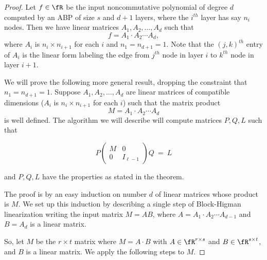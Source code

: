 \begin{proof}
  Let $f\in \fR$ be the input noncommutative polynomial of degree $d$
  computed by an ABP of size $s$ and $d+1$ layers, where the $i^{th}$
  layer has say $n_i$ nodes. Then we have linear matrices
  $A_1,A_2,\ldots,A_d$ such that
  \[
    f=A_1\cdot A_2\cdots A_d,
  \]
  where $A_i$ is $n_i\times n_{i+1}$ for each $i$ and $n_1=n_{d+1}=1$.
  Note that the $(j,k)^{th}$ entry of $A_i$ is the linear form
  labeling the edge from $j^{th}$ node in layer $i$ to $k^{th}$
  node in layer $i+1$.

  We will prove the following more general result, dropping the
  constraint that $n_1=n_{d+1}=1$. Suppose $A_1,A_2,\ldots,A_d$ are
  linear matrices of compatible dimensions ($A_i$ is
  $n_i\times n_{i+1}$ for each $i$) such that the matrix product
\[
  M=A_1\cdot A_2\cdots A_d
\]  
is well defined. The algorithm we will describe will compute matrices
$P, Q, L$ such that

\begin{equation}\label{higeq-block-product}
%
P\left(
\begin{array}{c|c}
M & 0 \\
\hline
0 & I_{\ell-1}
\end{array}
\right)Q ~=~L
\end{equation}

and $P, Q, L$ have the properties as stated in the theorem.

%

%
%

The proof is by an easy induction on number $d$ of linear matrices
whose product is $M$. We set up this induction by describing a single
step of Block-Higman linearization writing the input matrix $M=AB$,
where $A=A_1\cdot A_2\cdots A_{d-1}$ and $B=A_d$ is a linear matrix.

So, let $M$ be the $r \times t$ matrix where $M=A\cdot B$ with
$A \in \fR^{r\times s}$ and $B \in \fR^{s\times t}$, and $B$ is a linear
matrix. We apply the following steps to $M$.


\end{proof}
